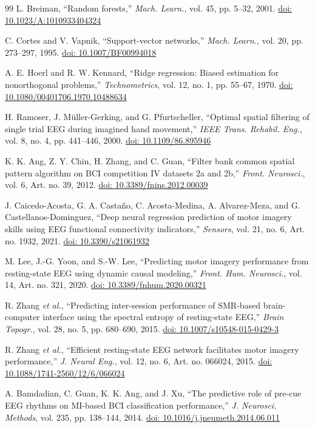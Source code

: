 \documentclass{ieeeaccess}
\newcommand{\doiref}[1]{\href{https://doi.org/#1}{doi: #1}}
\begin{document}
\begin{thebibliography}{99}
 L. Breiman, ``Random forests,'' \emph{Mach. Learn.}, vol. 45, pp. 5--32, 2001. \doiref{10.1023/A:1010933404324}

 C. Cortes and V. Vapnik, ``Support-vector networks,'' \emph{Mach. Learn.}, vol. 20, pp. 273--297, 1995. \doiref{10.1007/BF00994018}

 A. E. Hoerl and R. W. Kennard, ``Ridge regression: Biased estimation for nonorthogonal problems,'' \emph{Technometrics}, vol. 12, no. 1, pp. 55--67, 1970. \doiref{10.1080/00401706.1970.10488634}

 H. Ramoser, J. M\"uller-Gerking, and G. Pfurtscheller, ``Optimal spatial filtering of single trial EEG during imagined hand movement,'' \emph{IEEE Trans. Rehabil. Eng.}, vol. 8, no. 4, pp. 441--446, 2000. \doiref{10.1109/86.895946}

 K. K. Ang, Z. Y. Chin, H. Zhang, and C. Guan, ``Filter bank common spatial pattern algorithm on BCI competition IV datasets 2a and 2b,'' \emph{Front. Neurosci.}, vol. 6, Art. no. 39, 2012. \doiref{10.3389/fnins.2012.00039}

 J. Caicedo-Acosta, G. A. Casta\~no, C. Acosta-Medina, A. Alvarez-Meza, and G. Castellanos-Dominguez, ``Deep neural regression prediction of motor imagery skills using EEG functional connectivity indicators,'' \emph{Sensors}, vol. 21, no. 6, Art. no. 1932, 2021. \doiref{10.3390/s21061932}

 M. Lee, J.-G. Yoon, and S.-W. Lee, ``Predicting motor imagery performance from resting-state EEG using dynamic causal modeling,'' \emph{Front. Hum. Neurosci.}, vol. 14, Art. no. 321, 2020. \doiref{10.3389/fnhum.2020.00321}

 R. Zhang \textit{et al.}, ``Predicting inter-session performance of SMR-based brain-computer interface using the spectral entropy of resting-state EEG,'' \emph{Brain Topogr.}, vol. 28, no. 5, pp. 680--690, 2015. \doiref{10.1007/s10548-015-0429-3}

 R. Zhang \textit{et al.}, ``Efficient resting-state EEG network facilitates motor imagery performance,'' \emph{J. Neural Eng.}, vol. 12, no. 6, Art. no. 066024, 2015. \doiref{10.1088/1741-2560/12/6/066024}

 A. Bamdadian, C. Guan, K. K. Ang, and J. Xu, ``The predictive role of pre-cue EEG rhythms on MI-based BCI classification performance,'' \emph{J. Neurosci. Methods}, vol. 235, pp. 138--144, 2014. \doiref{10.1016/j.jneumeth.2014.06.011}


\end{thebibliography}
\end{document}
